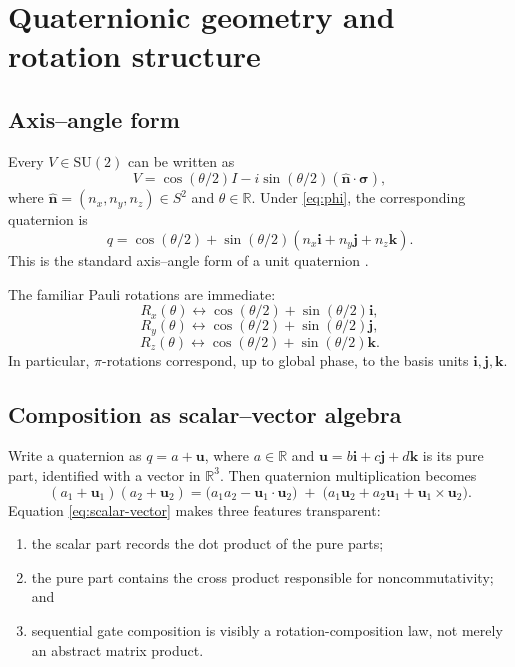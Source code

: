 \documentclass[11pt]{article}
\theoremstyle{remark}
\newcommand{\R}{\mathbb{R}}
\newcommand{\SU}{\mathrm{SU}}
\newcommand{\ii}{\mathbf{i}}
\newcommand{\jj}{\mathbf{j}}
\newcommand{\kk}{\mathbf{k}}
\newcommand{\Id}{I}
\newcommand{\bloch}[1]{\bm{#1}}
\newcommand{\qvec}{\mathbf{u}}
\begin{document}
\section{Quaternionic geometry and rotation structure}

\subsection{Axis--angle form}

Every $V\in\SU(2)$ can be written as
\begin{equation}
V=\cos(\theta/2)\Id-i\sin(\theta/2)(\hat{\bloch{n}}\cdot\bm{\sigma}),
\label{eq:axis-angle-su2}
\end{equation}
where $\hat{\bloch{n}}=(n_x,n_y,n_z)\in S^2$ and $\theta\in\R$. Under \eqref{eq:phi}, the corresponding quaternion is
\begin{equation}
q=\cos(\theta/2)+\sin(\theta/2)(n_x\ii+n_y\jj+n_z\kk).
\label{eq:axis-angle-quaternion}
\end{equation}
This is the standard axis--angle form of a unit quaternion \citep{kuipers1999,hall2015}.

The familiar Pauli rotations are immediate:
\[
R_x(\theta)\leftrightarrow \cos(\theta/2)+\sin(\theta/2)\ii,
\]
\[
R_y(\theta)\leftrightarrow \cos(\theta/2)+\sin(\theta/2)\jj,
\]
\[
R_z(\theta)\leftrightarrow \cos(\theta/2)+\sin(\theta/2)\kk.
\]
In particular, $\pi$-rotations correspond, up to global phase, to the basis units $\ii,\jj,\kk$.

\subsection{Composition as scalar--vector algebra}

Write a quaternion as $q=a+\qvec$, where $a\in\R$ and $\qvec=b\ii+c\jj+d\kk$ is its pure part, identified with a vector in $\R^3$. Then quaternion multiplication becomes
\begin{equation}
(a_1+\qvec_1)(a_2+\qvec_2)
=
\bigl(a_1a_2-\qvec_1\cdot\qvec_2\bigr)
\;+\;
\bigl(a_1\qvec_2+a_2\qvec_1+\qvec_1\times\qvec_2\bigr).
\label{eq:scalar-vector}
\end{equation}
Equation \eqref{eq:scalar-vector} makes three features transparent:
\begin{enumerate}[label=(\alph*)]
\item the scalar part records the dot product of the pure parts;
\item the pure part contains the cross product responsible for noncommutativity; and
\item sequential gate composition is visibly a rotation-composition law, not merely an abstract matrix product.
\end{enumerate}
\end{document}
